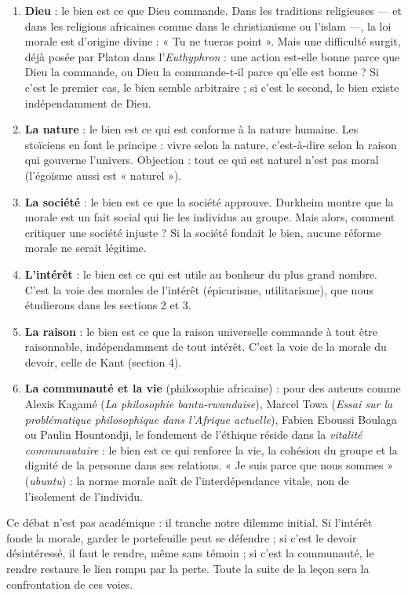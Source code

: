 \documentclass[11pt]{article}
\begin{document}
\begin{enumerate}
  \item \textbf{Dieu} : le bien est ce que Dieu commande. Dans les traditions religieuses — et dans les religions africaines comme dans le christianisme ou l'islam —, la loi morale est d'origine divine : « Tu ne tueras point ». Mais une difficulté surgit, déjà posée par Platon dans l'\emph{Euthyphron} : une action est-elle bonne parce que Dieu la commande, ou Dieu la commande-t-il parce qu'elle est bonne ? Si c'est le premier cas, le bien semble arbitraire ; si c'est le second, le bien existe indépendamment de Dieu.
  \item \textbf{La nature} : le bien est ce qui est conforme à la nature humaine. Les stoïciens en font le principe : vivre selon la nature, c'est-à-dire selon la raison qui gouverne l'univers. Objection : tout ce qui est naturel n'est pas moral (l'égoïsme aussi est « naturel »).
  \item \textbf{La société} : le bien est ce que la société approuve. Durkheim montre que la morale est un fait social qui lie les individus au groupe. Mais alors, comment critiquer une société injuste ? Si la société fondait le bien, aucune réforme morale ne serait légitime.
  \item \textbf{L'intérêt} : le bien est ce qui est utile au bonheur du plus grand nombre. C'est la voie des morales de l'intérêt (épicurisme, utilitarisme), que nous étudierons dans les sections 2 et 3.
  \item \textbf{La raison} : le bien est ce que la raison universelle commande à tout être raisonnable, indépendamment de tout intérêt. C'est la voie de la morale du devoir, celle de Kant (section 4).
  \item \textbf{La communauté et la vie} (philosophie africaine) : pour des auteurs comme Alexis Kagamé (\emph{La philosophie bantu-rwandaise}), Marcel Towa (\emph{Essai sur la problématique philosophique dans l'Afrique actuelle}), Fabien Eboussi Boulaga ou Paulin Hountondji, le fondement de l'éthique réside dans la \emph{vitalité communautaire} : le bien est ce qui renforce la vie, la cohésion du groupe et la dignité de la personne dans ses relations. « Je suis parce que nous sommes » (\emph{ubuntu}) : la norme morale naît de l'interdépendance vitale, non de l'isolement de l'individu.
\end{enumerate}

Ce débat n'est pas académique : il tranche notre dilemme initial. Si l'intérêt fonde la morale, garder le portefeuille peut se défendre ; si c'est le devoir désintéressé, il faut le rendre, même sans témoin ; si c'est la communauté, le rendre restaure le lien rompu par la perte. Toute la suite de la leçon sera la confrontation de ces voies.
\end{document}
